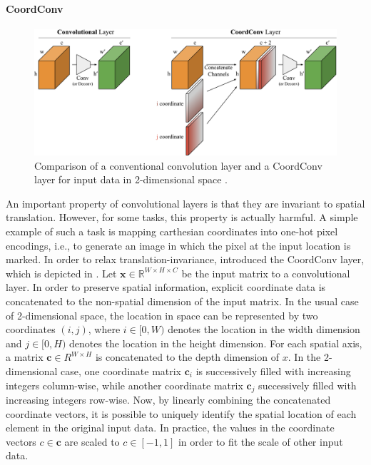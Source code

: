 \paragraph{CoordConv}
\label{subsec:bg.cnn.coordconv}
\begin{figure}
    \centering
    \includegraphics[width=\textwidth]{graphics/coordconv.pdf}
    \caption{Comparison of a conventional convolution layer and a CoordConv layer for input data in 2-dimensional space \citep{DBLP:conf/nips/LiuLMSFSY18}.}
    \label{fig:coordconv}
\end{figure}
An important property of convolutional layers is that they are invariant to spatial translation. However, for some tasks, this property is actually harmful. A simple example of such a task is mapping carthesian coordinates into one-hot pixel encodings, i.e., to generate an image in which the pixel at the input location is marked. In order to relax translation-invariance, \citet{DBLP:conf/nips/LiuLMSFSY18} introduced the CoordConv layer, which is depicted in . Let $\textbf{x}\in\mathbb{R}^{W\times H\times C}$ be the input matrix to a convolutional layer. In order to preserve spatial information, explicit coordinate data is concatenated to the non-spatial dimension of the input matrix. In the usual case of 2-dimensional space, the location in space can be represented by two coordinates $(i,j)$, where $i\in [0,W)$ denotes the location in the width dimension and $j\in [0,H)$ denotes the location in the height dimension. For each spatial axis, a matrix $\mathbf{c}\in R^{W\times H}$ is concatenated to the depth dimension of $x$. In the 2-dimensional case, one coordinate matrix $\mathbf{c}_i$ is successively filled with increasing integers column-wise, while another coordinate matrix $\mathbf{c}_j$ successively filled with increasing integers row-wise. Now, by linearly combining the concatenated coordinate vectors, it is possible to uniquely identify the spatial location of each element in the original input data. In practice, the values in the coordinate vectors $c\in\mathbf{c}$ are scaled to $c\in[-1,1]$ in order to fit the scale of other input data.

